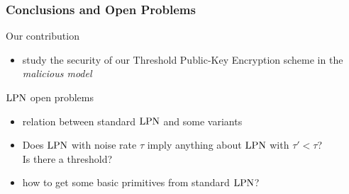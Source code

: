 \begin{frame}
 \frametitle{Conclusions and Open Problems}
 
 \begin{block}{Our contribution}
\begin{itemize}
 \item study the security of our Threshold Public-Key Encryption scheme in the \emph{malicious model}
\end{itemize}
  
 \end{block}
 
 \begin{block}{$\mathrm{LPN}$ open problems}
  \begin{itemize}
   \item<2-> relation between standard $\mathrm{LPN}$ and some variants
   \item<3-> Does $\mathrm{LPN}$ with noise rate $\tau$ imply anything about $\mathrm{LPN}$ with $\tau' < \tau$? \\ Is there a threshold?
   \item<4-> how to get some basic primitives from standard $\mathrm{LPN}$?
  \end{itemize}

 \end{block}
 

\end{frame}
